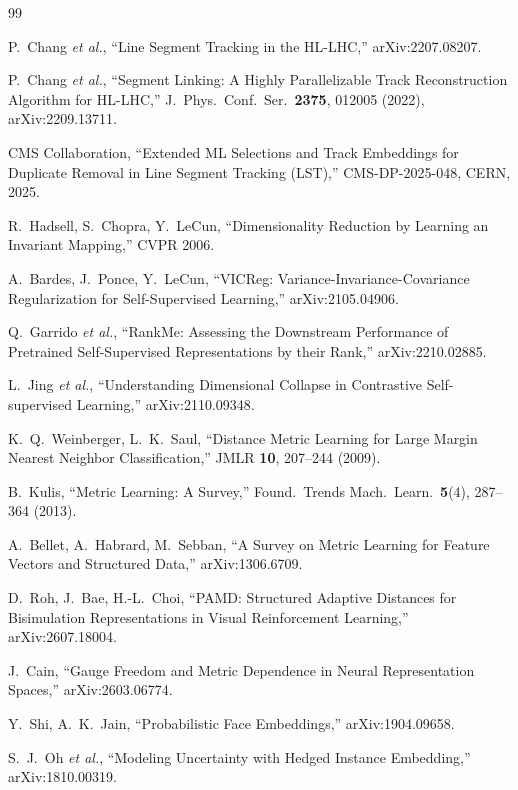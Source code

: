 \documentclass[11pt]{article}
\begin{document}
\begin{thebibliography}{99}

 P.~Chang \emph{et al.},
  ``Line Segment Tracking in the HL-LHC,'' arXiv:2207.08207.

 P.~Chang \emph{et al.},
  ``Segment Linking: A Highly Parallelizable Track Reconstruction Algorithm for
  HL-LHC,'' J.\ Phys.\ Conf.\ Ser.\ \textbf{2375}, 012005 (2022),
  arXiv:2209.13711.

 CMS Collaboration,
  ``Extended ML Selections and Track Embeddings for Duplicate Removal in Line
  Segment Tracking (LST),'' CMS-DP-2025-048, CERN, 2025.

 R.~Hadsell, S.~Chopra, Y.~LeCun,
  ``Dimensionality Reduction by Learning an Invariant Mapping,'' CVPR 2006.

 A.~Bardes, J.~Ponce, Y.~LeCun,
  ``VICReg: Variance-Invariance-Covariance Regularization for Self-Supervised
  Learning,'' arXiv:2105.04906.

 Q.~Garrido \emph{et al.},
  ``RankMe: Assessing the Downstream Performance of Pretrained Self-Supervised
  Representations by their Rank,'' arXiv:2210.02885.

 L.~Jing \emph{et al.},
  ``Understanding Dimensional Collapse in Contrastive Self-supervised
  Learning,'' arXiv:2110.09348.

 K.~Q.~Weinberger, L.~K.~Saul,
  ``Distance Metric Learning for Large Margin Nearest Neighbor
  Classification,'' JMLR \textbf{10}, 207--244 (2009).

 B.~Kulis,
  ``Metric Learning: A Survey,'' Found.\ Trends Mach.\ Learn.\ \textbf{5}(4),
  287--364 (2013).

 A.~Bellet, A.~Habrard, M.~Sebban,
  ``A Survey on Metric Learning for Feature Vectors and Structured Data,''
  arXiv:1306.6709.

 D.~Roh, J.~Bae, H.-L.~Choi,
  ``PAMD: Structured Adaptive Distances for Bisimulation Representations in
  Visual Reinforcement Learning,'' arXiv:2607.18004.

 J.~Cain,
  ``Gauge Freedom and Metric Dependence in Neural Representation Spaces,''
  arXiv:2603.06774.

 Y.~Shi, A.~K.~Jain,
  ``Probabilistic Face Embeddings,'' arXiv:1904.09658.

 S.~J.~Oh \emph{et al.},
  ``Modeling Uncertainty with Hedged Instance Embedding,'' arXiv:1810.00319.


\end{thebibliography}
\end{document}
